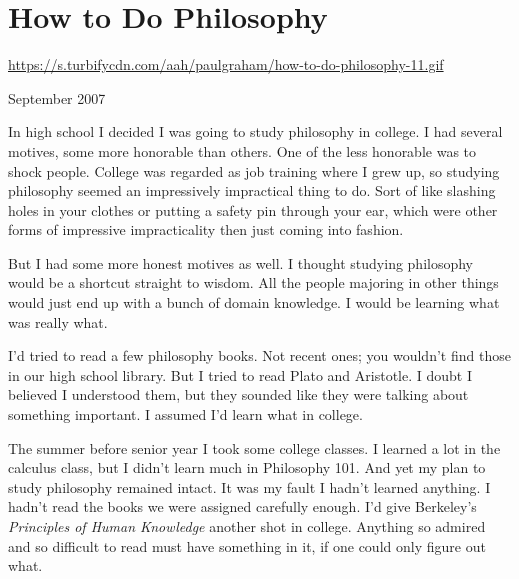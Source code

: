 \chapter{How to Do Philosophy}


            
              
                \href{https://s.turbifycdn.com/aah/paulgraham/how-to-do-philosophy-11.gif}{https://s.turbifycdn.com/aah/paulgraham/how-to-do-philosophy-11.gif}



September 2007

In high school I decided I was
                  going to study philosophy in college. I had several motives,
                  some more honorable than others. One of the less honorable was
                  to shock people. College was regarded as job training where I
                  grew up, so studying philosophy seemed an impressively
                  impractical thing to do. Sort of like slashing holes in your
                  clothes or putting a safety pin through your ear, which were
                  other forms of impressive impracticality then just coming into
                  fashion.

But I had some more honest motives as
                  well. I thought studying philosophy would be a shortcut
                  straight to wisdom. All the people majoring in other things
                  would just end up with a bunch of domain knowledge. I would be
                  learning what was really what.

I'd tried to read a
                  few philosophy books. Not recent ones; you wouldn't find those
                  in our high school library. But I tried to read Plato and
                  Aristotle. I doubt I believed I understood them, but they
                  sounded like they were talking about something important. I
                  assumed I'd learn what in college.

The summer
                  before senior year I took some college classes. I learned a
                  lot in the calculus class, but I didn't learn much in
                  Philosophy 101. And yet my plan to study philosophy remained
                  intact. It was my fault I hadn't learned anything. I hadn't
                  read the books we were assigned carefully enough. I'd give
                  Berkeley's \emph{Principles of Human Knowledge} another shot
                  in college. Anything so admired and so difficult to read must
                  have something in it, if one could only figure out what.

